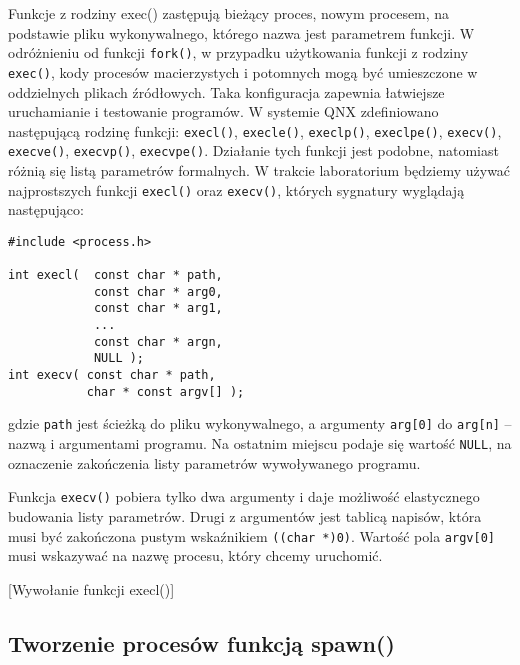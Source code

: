 Funkcje z rodziny exec() zastępują bieżący proces, nowym procesem, na podstawie
pliku wykonywalnego, którego nazwa jest parametrem funkcji. W odróżnieniu od
funkcji \texttt{fork()},  w przypadku użytkowania funkcji z rodziny
\texttt{exec()}, kody procesów macierzystych i potomnych mogą być umieszczone w
oddzielnych plikach źródłowych. Taka konfiguracja zapewnia łatwiejsze
uruchamianie i testowanie programów. W systemie QNX zdefiniowano następującą
rodzinę funkcji: \texttt{execl()}, \texttt{execle()}, \texttt{execlp()},
\texttt{execlpe()}, \texttt{execv()}, \texttt{execve()}, \texttt{execvp()},
\texttt{execvpe()}. Działanie tych funkcji jest podobne, natomiast różnią się
listą parametrów formalnych. W trakcie laboratorium będziemy używać
najprostszych funkcji \texttt{execl()} oraz \texttt{execv()}, których sygnatury
wyglądają następująco:

\begin{lstlisting}[style=MyCStyle]
#include <process.h>

int execl(  const char * path,
            const char * arg0,
            const char * arg1,
            ...
            const char * argn,
            NULL );
int execv( const char * path,
           char * const argv[] );
\end{lstlisting}

gdzie \texttt{path} jest ścieżką do pliku wykonywalnego, a argumenty
\texttt{arg[0]} do \texttt{arg[n]} -- nazwą i argumentami programu. Na ostatnim
miejscu podaje się wartość \texttt{NULL}, na oznaczenie zakończenia listy
parametrów wywoływanego programu.

Funkcja \texttt{execv()} pobiera tylko dwa argumenty i daje możliwość
elastycznego budowania listy parametrów. Drugi z argumentów jest tablicą
napisów, która musi być zakończona pustym wskaźnikiem \texttt{((char *)0)}.
Wartość pola \texttt{argv[0]} musi wskazywać na nazwę procesu, który chcemy
uruchomić.

\begin{example}{[Wywołanie funkcji execl()]}
  \label{ex:WHF3V}
  
\end{example}

\subsection{Tworzenie procesów funkcją spawn()}

